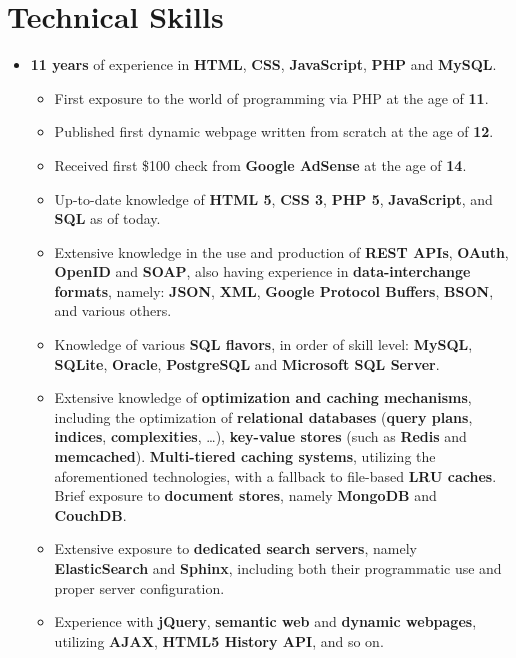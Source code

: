 \documentclass[11pt,a4paper]{article}
\begin{document}
\section{Technical Skills}
	\begin{itemize}
	\item	\label{webdev}  \textbf{11 years} of experience in \textbf{HTML}, \textbf{CSS}, \textbf{JavaScript}, \textbf{PHP} and \textbf{MySQL}.
		\begin{itemize}
		\item	First exposure to the world of programming via PHP at the age of \textbf{11}.
		\item	Published first dynamic webpage written from scratch at the age of \textbf{12}.
		\item	Received first \$100 check from \textbf{Google AdSense} at the age of \textbf{14}.
		\item	Up-to-date knowledge of \textbf{HTML 5}, \textbf{CSS 3}, \textbf{PHP 5}, \textbf{JavaScript}, and \textbf{SQL} as of today.
		\item	Extensive knowledge in the use and production of \textbf{REST APIs}, \textbf{OAuth}, \textbf{OpenID} and \textbf{SOAP}, also having experience in \textbf{data-interchange formats}, namely: \textbf{JSON}, \textbf{XML}, \textbf{Google Protocol Buffers}, \textbf{BSON}, and various others.
		\item	Knowledge of various \textbf{SQL flavors}, in order of skill level: \textbf{MySQL}, \textbf{SQLite}, \textbf{Oracle}, \textbf{PostgreSQL} and \textbf{Microsoft SQL Server}.
		\item	Extensive knowledge of \textbf{optimization and caching mechanisms}, including the optimization of \textbf{relational databases} (\textbf{query plans}, \textbf{indices}, \textbf{complexities}, \ldots), \textbf{key-value stores} (such as \textbf{Redis} and \textbf{memcached}). \textbf{Multi-tiered caching systems}, utilizing the aforementioned technologies, with a fallback to file-based \textbf{LRU caches}. Brief exposure to \textbf{document stores}, namely \textbf{MongoDB} and \textbf{CouchDB}.
		\item	Extensive exposure to \textbf{dedicated search servers}, namely \textbf{ElasticSearch} and \textbf{Sphinx}, including both their programmatic use and proper server configuration. 
		\item	Experience with \textbf{jQuery}, \textbf{semantic web} and \textbf{dynamic webpages}, utilizing \textbf{AJAX}, \textbf{HTML5 History API}, and so on.

\end{itemize}
\end{itemize}
\end{document}

